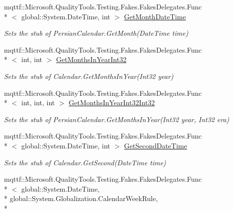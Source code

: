 \begin{DoxyCompactItemize}
mqttf\-::\-Microsoft.\-Quality\-Tools.\-Testing.\-Fakes.\-Fakes\-Delegates.\-Func\\*
$<$ global\-::\-System.\-Date\-Time, int $>$ \hyperlink{class_system_1_1_globalization_1_1_fakes_1_1_stub_persian_calendar_aed9a849aaa3cb16f64f25a6cde1df7d2}{Get\-Month\-Date\-Time}
\begin{DoxyCompactList}\small\item\em Sets the stub of Persian\-Calendar.\-Get\-Month(\-Date\-Time time)\end{DoxyCompactList}\item 
mqttf\-::\-Microsoft.\-Quality\-Tools.\-Testing.\-Fakes.\-Fakes\-Delegates.\-Func\\*
$<$ int, int $>$ \hyperlink{class_system_1_1_globalization_1_1_fakes_1_1_stub_persian_calendar_a569b4139909e88ea0068cad36eaadf4d}{Get\-Months\-In\-Year\-Int32}
\begin{DoxyCompactList}\small\item\em Sets the stub of Calendar.\-Get\-Months\-In\-Year(\-Int32 year)\end{DoxyCompactList}\item 
mqttf\-::\-Microsoft.\-Quality\-Tools.\-Testing.\-Fakes.\-Fakes\-Delegates.\-Func\\*
$<$ int, int, int $>$ \hyperlink{class_system_1_1_globalization_1_1_fakes_1_1_stub_persian_calendar_aede945a44e0bfe44b817016b205e61ab}{Get\-Months\-In\-Year\-Int32\-Int32}
\begin{DoxyCompactList}\small\item\em Sets the stub of Persian\-Calendar.\-Get\-Months\-In\-Year(\-Int32 year, Int32 era)\end{DoxyCompactList}\item 
mqttf\-::\-Microsoft.\-Quality\-Tools.\-Testing.\-Fakes.\-Fakes\-Delegates.\-Func\\*
$<$ global\-::\-System.\-Date\-Time, int $>$ \hyperlink{class_system_1_1_globalization_1_1_fakes_1_1_stub_persian_calendar_af12dd55dc341d844a83f21c2dc84b7ac}{Get\-Second\-Date\-Time}
\begin{DoxyCompactList}\small\item\em Sets the stub of Calendar.\-Get\-Second(\-Date\-Time time)\end{DoxyCompactList}\item 
mqttf\-::\-Microsoft.\-Quality\-Tools.\-Testing.\-Fakes.\-Fakes\-Delegates.\-Func\\*
$<$ global\-::\-System.\-Date\-Time, \\*
global\-::\-System.\-Globalization.\-Calendar\-Week\-Rule, \\*

\end{DoxyCompactItemize}
